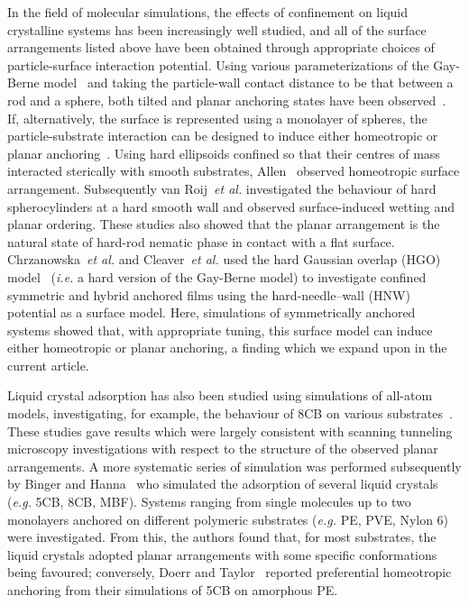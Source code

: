 \documentclass[aps,10pt,twocolumn]{revtex4}
\makeatletter
\newcommand{\etal}{\emph{et al.}\@\xspace}
\newcommand{\ie}{\emph{i.e.}\@\xspace}
\newcommand{\eg}{\emph{e.g.}\@\xspace}
\makeatother
\begin{document}
In the field of molecular simulations, the effects of confinement on liquid crystalline systems has been
increasingly well studied, and all of the surface arrangements listed above have been obtained through appropriate
choices of particle-surface interaction potential. Using various parameterizations of the Gay-Berne
model~\cite{GayBerne81} and taking the particle-wall contact distance to be that between a rod and a sphere, both
tilted and planar anchoring states have been observed~\cite{ZhangChakrabarti96, WallCleaver97, LathamCleaver00,
WallCleaver03}. If, alternatively, the surface is represented using a monolayer of spheres, the particle-substrate
interaction can be designed to induce either homeotropic or planar anchoring~\cite{GruhnSchoen97, GruhnSchoen98,
GruhnSchoen98a}. Using hard ellipsoids confined so that their centres of mass interacted sterically with smooth
substrates, Allen~\cite{Allen99} observed homeotropic surface arrangement. Subsequently van
Roij~\etal\cite{VanRoijDijkstra00, VanRoijDijkstra00a, DijkstraVanRoij01} investigated the behaviour of hard
spherocylinders at a hard smooth wall and observed surface-induced wetting and planar ordering. These studies also
showed that the planar arrangement is the natural state of hard-rod nematic phase in contact with a flat surface.
Chrzanowska~\etal and Cleaver~\etal\cite{Chrzanowska_Teixera_01, Cleaver_Teixeira_01} used the hard Gaussian
overlap (HGO) model~\cite{BernePechukas72} (\ie a hard version of the Gay-Berne model) to investigate confined
symmetric and hybrid anchored films using the hard-needle--wall (HNW) potential as a surface model. Here,
simulations of symmetrically anchored systems showed that, with appropriate tuning, this surface model can induce
either homeotropic or planar anchoring, a finding which we expand upon in the current article.

Liquid crystal adsorption has also been studied using simulations of all-atom models, investigating, for
example, the behaviour of 8CB on various substrates~\cite{CleaverTildesley94, YoneyaIwakabe95, CleaverCallaway95}.
These studies gave results which were largely consistent with scanning tunneling microscopy investigations with
respect to the structure of the observed planar arrangements. A more systematic series of simulation was performed
subsequently by Binger and Hanna~\cite{BingerHanna99, BingerHanna00, BingerHanna01} who simulated the adsorption
of several liquid crystals (\eg 5CB, 8CB, MBF). Systems ranging from single molecules up to two monolayers
anchored on different polymeric substrates (\eg PE, PVE, Nylon 6) were investigated. From this, the authors found
that, for most substrates, the liquid crystals adopted planar arrangements with some specific conformations being
favoured; conversely, Doerr and Taylor~\cite{DoerrTaylor99, DoerrTaylor99a} reported preferential homeotropic
anchoring from their simulations of 5CB on amorphous PE.
\end{document}
